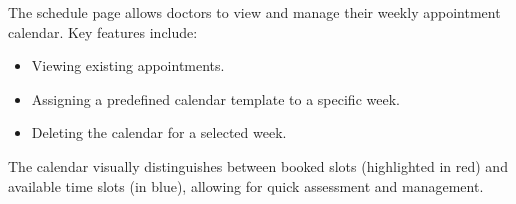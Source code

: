 The schedule page allows doctors to view and manage their weekly appointment calendar. Key features include:
\begin{itemize}
	\item Viewing existing appointments.
	\item Assigning a predefined calendar template to a specific week.
	\item Deleting the calendar for a selected week.
\end{itemize}

The calendar visually distinguishes between booked slots (highlighted in red) and available time slots (in blue), allowing for quick assessment and management.